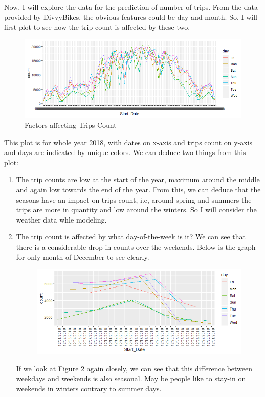 \documentclass[11pt]{article}
\begin{document}
Now, I will explore the data for the prediction of number of trips. From the data provided by DivvyBikes, the obvious features could be day and month. So, I will first plot to see how the trip count is affected by these two.

\begin{figure}[h!]
  \includegraphics[width=1\linewidth]{Rplot1.png}
  \caption{Factors affecting Trips Count}
\end{figure}

This plot is for whole year 2018, with dates on x-axis and trips count on y-axis and days are indicated by unique colors. We can deduce two things from this plot: 
\begin{enumerate}
\item The trip counts are low at the start of the year, maximum around the middle and again low towards the end of the year. From this, we can deduce that the seasons have an impact on trips count, i.e, around spring and summers the trips are more in quantity and low around the winters. So I will consider the weather data whle modeling.
\item The trip count is affected by what day-of-the-week is it? We can see that there is a considerable drop in counts over the weekends. Below is the graph for only month of December to see clearly.
\begin{figure}[h!]
  \includegraphics[width=1\linewidth]{Rplot.png}
\end{figure}

If we look at Figure 2 again closely, we can see that this difference between weekdays and weekends is also seasonal. May be people like to stay-in on weekends in winters contrary to summer days.
\end{enumerate}
\end{document}
